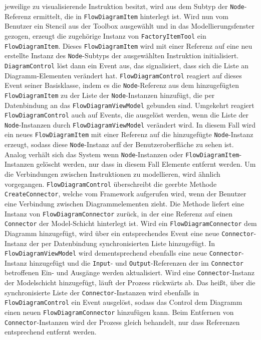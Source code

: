 jeweilige zu visualisierende Instruktion besitzt, wird aus dem Subtyp der \texttt{Node}-Referenz ermittelt, die in \texttt{FlowDiagramItem} hinterlegt ist.
\newline
Wird nun vom Benutzer ein Stencil aus der Toolbox ausgewählt und in das Modellierungsfenster gezogen, erzeugt die zugehörige Instanz von \texttt{FactoryItemTool} ein \texttt{FlowDiagramItem}. Dieses \texttt{FlowDiagramItem} wird mit einer Referenz auf eine neu erstellte Instanz des \texttt{Node}-Subtyps der ausgewählten Instruktion initialisiert. \texttt{DiagramControl} löst dann ein Event aus, das signalisiert, dass sich die Liste an Diagramm-Elementen verändert hat. \texttt{FlowDiagramControl} reagiert auf dieses Event seiner Basisklasse, indem es die \texttt{Node}-Referenz aus dem hinzugefügten \texttt{FlowDiagramItem} zu der Liste der \texttt{Node}-Instanzen hinzufügt, die per Datenbindung an das \texttt{FlowDiagramViewModel} gebunden sind. Umgekehrt reagiert \texttt{FlowDiagramControl} auch auf Events, die ausgelöst werden, wenn die Liste der \texttt{Node}-Instanzen durch \texttt{FlowDiagramViewModel} verändert wird. In diesem Fall wird ein neues \texttt{FlowDiagramItem} mit einer Referenz auf die hinzugefügte \texttt{Node}-Instanz erzeugt, sodass diese \texttt{Node}-Instanz auf der Benutzeroberfläche zu sehen ist. Analog verhält sich das System wenn \texttt{Node}-Instanzen oder \texttt{FlowDiagramItem}-Instanzen gelöscht werden, nur dass in diesem Fall Elemente entfernt werden.
\newline
Um die Verbindungen zwischen Instruktionen zu modellieren, wird ähnlich vorgegangen. \texttt{FlowDiagramControl} überschreibt die geerbte Methode \texttt{CreateConnector}, welche vom Framework aufgerufen wird, wenn der Benutzer eine Verbindung zwischen Diagrammelementen zieht. Die Methode liefert eine Instanz von \texttt{Flow\-Dia\-gram\-Con\-nec\-tor} zurück, in der eine Referenz auf einen \texttt{Connector} der Model-Schicht hinterlegt ist. Wird ein \texttt{FlowDiagramConnector} dem Diagramm hinzugefügt, wird über ein entsprechendes Event eine neue \texttt{Connector}-Instanz der per Datenbindung synchronisierten Liste hinzugefügt. In \texttt{FlowDiagramViewModel} wird dementsprechend ebenfalls eine neue \texttt{Connector}-Instanz hinzugefügt und die \texttt{Input}- und \texttt{Output}-Referenzen der im \texttt{Connector} betroffenen Ein- und Ausgänge werden aktualisiert. Wird eine \texttt{Connector}-Instanz der Modelschicht hinzugefügt, läuft der Prozess rückwärts ab. Das heißt, über die synchronisierte Liste der \texttt{Connector}-Instanzen wird ebenfalls in \texttt{FlowDiagramControl} ein Event ausgelöst, sodass das Control dem Diagramm einen neuen \texttt{Flow\-Dia\-gram\-Co\-nnec\-tor} hinzufügen kann. Beim Entfernen von \texttt{Connector}-Instanzen wird der Prozess gleich behandelt, nur dass Referenzen entsprechend entfernt werden.      

